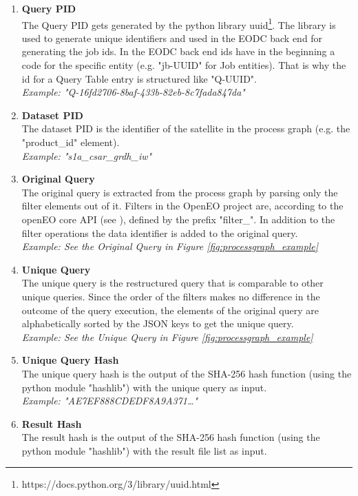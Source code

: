 \documentclass[draft,final]{vutinfth} %
\begin{document}
\begin{enumerate}
	\item \textbf{Query PID} \\
	The Query PID gets generated by the python library uuid\footnote{https://docs.python.org/3/library/uuid.html}. The library is used to generate unique identifiers and used in the EODC back end for generating the job ids. In the EODC back end ids have in the beginning a code for the specific entity (e.g. "jb-UUID" for Job entities). That is why the id for a Query Table entry is structured like "Q-UUID". \\
	\textit{Example: "Q-16fd2706-8baf-433b-82eb-8c7fada847da"}
	\item \textbf{Dataset PID} \\
	The dataset PID is the identifier of the satellite in the process graph (e.g. the "product\_id" element). \\
	\textit{Example: "s1a\_csar\_grdh\_iw"}	    	
	\item\textbf{Original Query} \\
	The original query is extracted from the process graph by parsing only the filter elements out of it. Filters in the OpenEO project are, according to the openEO core API (see \cite{openeo_api_desc}), defined by the prefix "filter\_". In addition to the filter operations the data identifier is added to the original query. \\
	\textit{Example: See the Original Query in Figure \ref{fig:processgraph_example}}	 
	\item \textbf{Unique Query} \\
	The unique query is the restructured query that is comparable to other unique queries. Since the order of the filters makes no difference in the outcome of the query execution, the elements of the original query are alphabetically sorted by the JSON keys to get the unique query. \\
	\textit{Example: See the Unique Query in Figure \ref{fig:processgraph_example}}	  	 	
	\item \textbf{Unique Query Hash} \\
	The unique query hash is the output of the SHA-256 hash function (using the python module "hashlib") with the unique query as input. \\
	\textit{Example: "AE7EF888CDEDF8A9A371\dots"} 
	\item \textbf{Result Hash} \\
	The result hash is the output of the SHA-256 hash function (using the python module "hashlib") with the result file list as input. \\

\end{enumerate}
\end{document}
